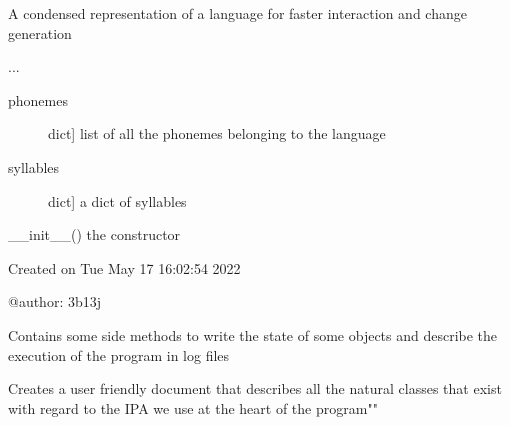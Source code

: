 \documentclass[letterpaper,10pt,english]{sphinxmanual}
\begin{document}

\begin{fulllineitems}
\label{\detokenize{index:Language.State}}
\sphinxAtStartPar
A condensed representation of a language for faster interaction and change generation

\sphinxAtStartPar
...
\begin{description}
\item[{phonemes}] \leavevmode{[}dict{]}
\sphinxAtStartPar
list of all the phonemes belonging to the language

\item[{syllables}] \leavevmode{[}dict{]}
\sphinxAtStartPar
a dict of syllables

\end{description}

\sphinxAtStartPar
\_\_init\_\_() the constructor

\end{fulllineitems}

\label{\detokenize{index:module-log_utilities}}
\sphinxAtStartPar
Created on Tue May 17 16:02:54 2022

\sphinxAtStartPar
@author: 3b13j

\sphinxAtStartPar
Contains some side methods to write the state of some objects and describe the execution of the program  in log files

\begin{fulllineitems}
\label{\detokenize{index:log_utilities.create_breviary}}
\sphinxAtStartPar
Creates a user friendly document that describes all the natural classes that exist with regard to the
IPA we use at the heart of the program""

\end{fulllineitems}

\end{document}
